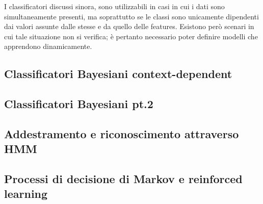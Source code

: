 \documentclass{subfiles}
\begin{document}
I classificatori discussi sinora, sono utilizzabili in casi in cui i dati sono simultaneamente presenti,
ma soprattutto se le classi sono unicamente dipendenti dai valori assunte dalle stesse e da quello delle features.
Esistono però scenari in cui tale situazione non si verifica; è pertanto necessario poter definire modelli che apprendono dinamicamente.

\subsection{Classificatori Bayesiani context-dependent}


\subsection{Classificatori Bayesiani pt.2}


\subsection{Addestramento e riconoscimento attraverso HMM}


\subsection{Processi di decisione di Markov e reinforced learning}

\end{document}
